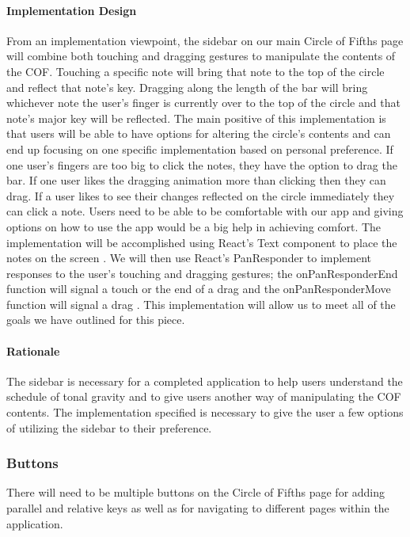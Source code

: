 \documentclass[onecolumn, draftclsnofoot,10pt, compsoc]{IEEEtran}
\begin{document}

\paragraph{Implementation Design}
From an implementation viewpoint, the sidebar on our main Circle of Fifths page will combine both touching and dragging gestures to manipulate the contents of the COF.
Touching a specific note will bring that note to the top of the circle and reflect that note’s key.
Dragging along the length of the bar will bring whichever note the user’s finger is currently over to the top of the circle and that note’s major key will be reflected.
The main positive of this implementation is that users will be able to have options for altering the circle's contents and can end up focusing on one specific implementation based on personal preference.
If one user's fingers are too big to click the notes, they have the option to drag the bar.
If one user likes the dragging animation more than clicking then they can drag.
If a user likes to see their changes reflected on the circle immediately they can click a note.
Users need to be able to be comfortable with our app and giving options on how to use the app would be a big help in achieving comfort.
The implementation will be accomplished using React’s Text component to place the notes on the screen \cite{react-text}.
We will then use React’s PanResponder to implement responses to the user’s touching and dragging gestures;
the onPanResponderEnd function will signal a touch or the end of a drag and the onPanResponderMove function will signal a drag \cite{react-pan}.
This implementation will allow us to meet all of the goals we have outlined for this piece.
	
\paragraph{Rationale}
The sidebar is necessary for a completed application to help users understand the schedule of tonal gravity and to give users another way of manipulating the COF contents.
The implementation specified is necessary to give the user a few options of utilizing the sidebar to their preference.
	
\subsubsection{Buttons}
There will need to be multiple buttons on the Circle of Fifths page for adding parallel and relative keys as well as for navigating to different pages within the application.
\end{document}
